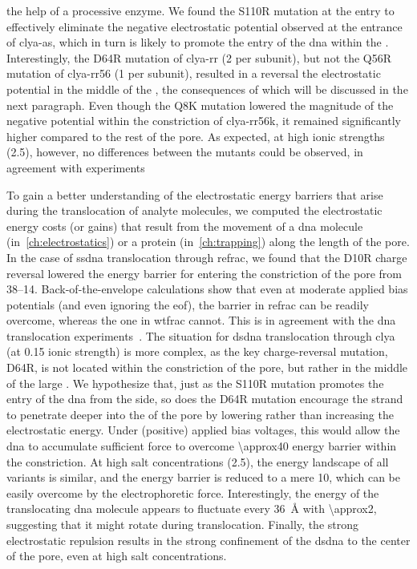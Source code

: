 the help of a processive enzyme. We found the S110R mutation at the \cisi{} entry to effectively eliminate the
negative electrostatic potential observed at the \cisi{} entrance of \gls{clya-as}, which in turn is likely to
promote the entry of the \gls{dna} within the \lumen{}. Interestingly, the D64R mutation of \gls{clya-rr}
(\SI{+2}{\ec} per subunit), but not the Q56R mutation of \gls{clya-rr56} (\SI{+1}{\ec} per subunit), resulted
in a reversal the electrostatic potential in the middle of the \lumen{}, the consequences of which will be
discussed in the next paragraph. Even though the Q8K mutation lowered the magnitude of the negative potential
within the constriction of \gls{clya-rr56k}, it remained significantly higher compared to the rest of the
pore. As expected, at high ionic strengths (\SI{2.5}{\Molar}), however, no differences between the mutants
could be observed, in agreement with experiments~\cite{Franceschini-2013,Franceschini-2016}

To gain a better understanding of the electrostatic energy barriers that arise during the translocation of
analyte molecules, we computed the electrostatic energy costs (or gains) that result from the movement of a
\gls{dna} molecule (in~\cref{ch:electrostatics}) or a protein (in~\cref{ch:trapping}) along the length of the
pore. In the case of \gls{ssdna} translocation through \gls{refrac}, we found that the D10R charge reversal
lowered the energy barrier for entering the constriction of the pore from \SIrange{38}{14}{\kbt}.
Back-of-the-envelope calculations show that even at moderate applied bias potentials (and even ignoring the
\gls{eof}), the barrier in \gls{refrac} can be readily overcome, whereas the one in \gls{wtfrac} cannot. This
is in agreement with the \gls{dna} translocation experiments~\cite{Wloka-2016}. The situation for \gls{dsdna}
translocation through \gls{clya} (at \SI{0.15}{\Molar} ionic strength) is more complex, as the key
charge-reversal mutation, D64R, is not located within the constriction of the pore, but rather in the middle
of the large \cisi{} \lumen{}. We hypothesize that, just as the S110R mutation promotes the entry of the
\gls{dna} from the \cisi{} side, so does the D64R mutation encourage the strand to penetrate deeper into the
\lumen{} of the pore by lowering rather than increasing the electrostatic energy. Under (positive) applied
bias voltages, this would allow the \gls{dna} to accumulate sufficient force to overcome \SI{\approx40}{\kbt}
energy barrier within the constriction. At high salt concentrations (\SI{2.5}{\Molar}), the energy landscape
of all variants is similar, and the energy barrier is reduced to a mere \SI{10}{\kbt}, which can be easily
overcome by the electrophoretic force. Interestingly, the energy of the translocating \gls{dna} molecule
appears to fluctuate every \SI{36}{\angstrom} with \SI{\approx2}{\kbt}, suggesting that it might rotate during
translocation. Finally, the strong electrostatic repulsion results in the strong confinement of the
\gls{dsdna} to the center of the pore, even at high salt concentrations.

